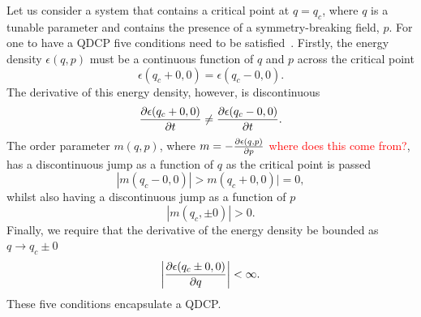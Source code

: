 Let us consider a system that contains a critical point at
\( q = q_c \), where \( q \) is a tunable parameter and contains
the presence of a symmetry-breaking field, \( p \).
For one to have a QDCP five conditions need to be satisfied~\cite{Suzuki2015}.
Firstly, the energy density \( \epsilon(q, p) \) must be a continuous
function of \( q \) and \( p \) across the critical point
\begin{equation}
    \epsilon(q_c + 0, 0) = \epsilon(q_c - 0, 0).
    \label{eq: continuous-energy-cond}
\end{equation}
The derivative of this energy density, however, is discontinuous
\begin{equation}
    \pdv{\epsilon(q_c + 0, 0)}{t} \neq \pdv{\epsilon(q_c - 0, 0)}{t}.
\end{equation}
The order parameter \( m(q, p) \), where
\( m=-\pdv{\epsilon(q, p)}{p} \)
\textcolor{red}{where does this come from?},
has a discontinuous jump as a function of \( q \) as the critical point is
passed
\begin{equation}
    |m(q_c - 0, 0)| > m(q_c + 0, 0)| = 0,
\end{equation}
whilst also having a discontinuous jump as a function of \( p \)
\begin{equation}
    |m(q_c, \pm 0)| > 0.
\end{equation}
Finally, we require that the derivative of the energy density be bounded as
\( q \rightarrow q_c \pm 0 \)
\begin{equation}
    \left|\pdv{\epsilon(q_c \pm 0, 0)}{q}\right| < \infty.
    \label{eq: bounded-energy-derivative-cond}
\end{equation}
These five conditions encapsulate a QDCP\@.

